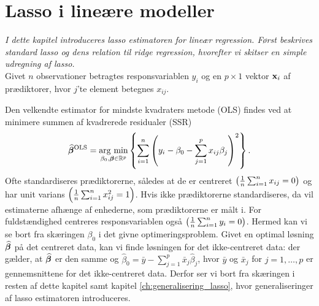 \chapter{Lasso i lineære modeller}
\textit{I dette kapitel introduceres lasso estimatoren for lineær regression. 
Først beskrives standard lasso og dens relation til ridge regression, hvorefter vi skitser en simple udregning af lasso.} \\[4mm]
%
Givet \(n\) observationer betragtes responsvariablen \(y_i\) og en \(p \times 1\) vektor \(\mathbf{x}_i\) af prædiktorer, hvor \(j\)'te element betegnes \(x_{ij}\).

Den velkendte estimator for mindste kvadraters metode (OLS) findes ved at minimere summen af kvadrerede residualer (SSR)
\begin{align}
\widehat{\tbeta}^\text{OLS} = \argmin_{\beta_0, \tbeta \in \R^p} \cbr{\sum_{i=1}^n \del{y_i - \beta_0 - \sum_{j=1}^p x_{ij} \beta_j}^2}. \label{eq:OLS}
\end{align}
%
Ofte standardiseres prædiktorerne, således at de er centreret \( \del{\frac{1}{n} \sum_{i=1}^n x_{ij} = 0}\) og har unit varians \( \del{\frac{1}{n} \sum_{i=1}^n x_{ij}^2=1}\).
Hvis ikke prædiktorerne standardiseres, da vil estimaterne afhænge af enhederne, som prædiktorerne er målt i.
For fuldstændighed centreres responsvariablen også \( \del{\frac{1}{n} \sum_{i=1}^n y_{i} = 0} \).
Hermed kan vi se bort fra skæringen $\beta_0$ i det givne optimeringsproblem.
Givet en optimal løsning \(\widehat{\boldsymbol{\beta}}\) på det centreret data, kan vi finde løsningen for det ikke-centreret data: der gælder, at \(\widehat{\boldsymbol{\beta}}\) er den samme og 
\(\widehat{\beta}_0 = \bar{y} - \sum_{j=1}^p \bar{x}_j \widehat{\beta}_j\), hvor \(\bar{y}\) og \(\bar{x}_j \) for \(j=1, \ldots, p\) er gennemsnittene for det ikke-centreret data.
Derfor ser vi bort fra skæringen i resten af dette kapitel samt kapitel \ref{ch:generalisering_lasso}, hvor generaliseringer af lasso estimatoren introduceres.

